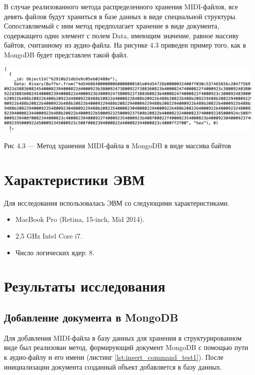 В случае реализованного метода распределенного хранения MIDI-файлов, все девять файлов будут храниться в базе данных в виде специальной структуры. Сопоставляемый с ним метод предполагает хранение в виде документа, содержащего один элемент с полем Data, имеющим значение, равное массиву байтов, считанному из аудио-файла. На рисунке 4.3 приведен пример того, как в MongoDB будет представлен такой файл.

\begin{center}
		\includegraphics[scale=0.5]{tex/img/Bytes.png}
		
			Рис 4.3 — Метод хранения MIDI-файла в MongoDB в виде массива байтов
\end{center}

\section{Характеристики ЭВМ}

Для исследования использовалась ЭВМ со следующими характеристиками.
\begin{itemize}
	\item MacBook Pro (Retina, 15-inch, Mid 2014).
	\item 2,5 GHz Intel Core i7.
	\item Число логических ядер: 8.
\end{itemize}

\section{Результаты исследования}

\subsection{Добавление документа в MongoDB}

Для добавления MIDI-файла в базу данных для хранения в структурированном виде был реализован метод, формирующий документ MongoDB с помощью пути к аудио-файлу и его имени (листинг \ref{lst:insert_command_test1}). После инициализации документа созданный объект добавляется в базу данных.

